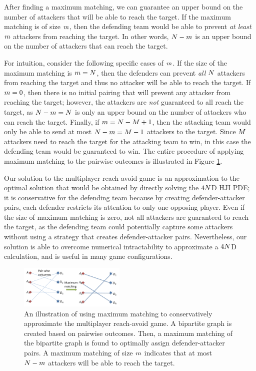 After finding a maximum matching, we can guarantee an upper bound on the number of attackers that will be able to reach the target. If the maximum matching is of size $m$, then the defending team would be able to prevent \textit{at least} $m$ attackers from reaching the target. In other words, $N-m$ is an upper bound on the number of attackers that can reach the target.

For intuition, consider the following specific cases of $m$. If the size of the maximum matching is $m=N$, then the defenders can prevent \textit{all} $N$ attackers from reaching the target and thus no attacker will be able to reach the target. If $m=0$, then there is no initial pairing that will prevent any attacker from reaching the target; however, the attackers are \textit{not} guaranteed to all reach the target, as $N-m=N$ is only an upper bound on the number of attackers who can reach the target. Finally, if $m=N-M+1$, then the attacking team would only be able to send at most $N-m=M-1$ attackers to the target. Since $M$ attackers need to reach the target for the attacking team to win, in this case the defending team would be guaranteed to win. The entire procedure of applying maximum matching to the pairwise outcomes is illustrated in Figure \ref{fig:general_procedure}.

Our solution to the multiplayer reach-avoid game is an approximation to the optimal solution that would be obtained by directly solving the $4N$D HJI PDE; it is conservative for the defending team because by creating defender-attacker pairs, each defender restricts its attention to only one opposing player. Even if the size of maximum matching is zero, not all attackers are guaranteed to reach the target, as the defending team could potentially capture some attackers without using a strategy that creates defender-attacker pairs. Nevertheless, our solution is able to overcome numerical intractability to approximate a $4N$D calculation, and is useful in many game configurations.

\begin{figure}
\centering
\includegraphics[width=0.45\textwidth]{"fig/general procedure"}
\caption{An illustration of using maximum matching to conservatively approximate the multiplayer reach-avoid game. A bipartite graph is created based on pairwise outcomes. Then, a maximum matching of the bipartite graph is found to optimally assign defender-attacker pairs. A maximum matching of size $m$ indicates that at most $N-m$ attackers will be able to reach the target.}
\label{fig:general_procedure}
\end{figure}

